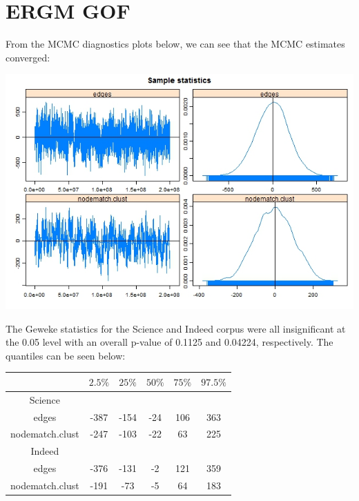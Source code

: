 \documentclass[12pt]{article}
\begin{document}
\newpage
\hypertarget{B}{}
\section{ERGM GOF}
From the MCMC diagnostics plots below, we can see that the MCMC estimates converged:
\vspace{2mm}
\begin{center} 
	\includegraphics[scale=0.4]{Images/ind_mcmc1.jpeg} 
\end{center} 
\vspace{2mm}
The Geweke statistics for the Science and Indeed corpus were all insignificant at the 0.05 level with an overall p-value of 0.1125 and 0.04224, respectively. The quantiles can be seen below:
 \vspace{2mm}
 \begin{center}
 	\begin{tabular}{ |c||c|c|c|c|c|  }
 		\hline
 		&$2.5\%$     &$25\%$     &$50\%$    &$75\%$  &$97.5\%$ \\
 		\hline
 		Science&&&&& \\
 		\hline
 		edges&           -387&  -154&  -24&  106&  363 \\
 		nodematch.clust&  -247&  -103&  -22&  63&225 \\
 		\hline
 		Indeed&&&&& \\
 		\hline
 		edges&           -376&  -131&  -2&  121&  359 \\
 		nodematch.clust&  -191&  -73&  -5&  64&183 \\
 		\hline
 	\end{tabular}
 \end{center}
 \vspace{2mm}
\end{document}
